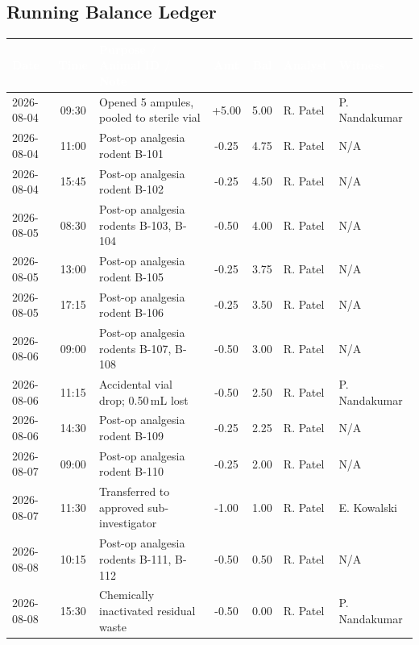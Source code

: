 \subsection*{\color{brandnavy}Running Balance Ledger}
\begin{tabularx}{\linewidth}{@{} l c X c c l l @{}}
\toprule
\rowcolor{brandnavy}
\textcolor{white}{\textbf{Date}} & \textcolor{white}{\textbf{Time}} & \textcolor{white}{\textbf{Purpose / Animal ID / Note}} & \textcolor{white}{\textbf{Amt}} & \textcolor{white}{\textbf{Bal}} & \textcolor{white}{\textbf{Analyst}} & \textcolor{white}{\textbf{Witness}} \\
\midrule
2026-08-04 & 09:30 & Opened 5 ampules, pooled to sterile vial & +5.00 & 5.00 & R. Patel & P. Nandakumar \\
2026-08-04 & 11:00 & Post-op analgesia rodent B-101 & -0.25 & 4.75 & R. Patel & N/A \\
2026-08-04 & 15:45 & Post-op analgesia rodent B-102 & -0.25 & 4.50 & R. Patel & N/A \\
2026-08-05 & 08:30 & Post-op analgesia rodents B-103, B-104 & -0.50 & 4.00 & R. Patel & N/A \\
2026-08-05 & 13:00 & Post-op analgesia rodent B-105 & -0.25 & 3.75 & R. Patel & N/A \\
2026-08-05 & 17:15 & Post-op analgesia rodent B-106 & -0.25 & 3.50 & R. Patel & N/A \\
2026-08-06 & 09:00 & Post-op analgesia rodents B-107, B-108 & -0.50 & 3.00 & R. Patel & N/A \\
2026-08-06 & 11:15 & Accidental vial drop; 0.50\,mL lost & -0.50 & 2.50 & R. Patel & P. Nandakumar \\
2026-08-06 & 14:30 & Post-op analgesia rodent B-109 & -0.25 & 2.25 & R. Patel & N/A \\
2026-08-07 & 09:00 & Post-op analgesia rodent B-110 & -0.25 & 2.00 & R. Patel & N/A \\
2026-08-07 & 11:30 & Transferred to approved sub-investigator & -1.00 & 1.00 & R. Patel & E. Kowalski \\
2026-08-08 & 10:15 & Post-op analgesia rodents B-111, B-112 & -0.50 & 0.50 & R. Patel & N/A \\
2026-08-08 & 15:30 & Chemically inactivated residual waste & -0.50 & 0.00 & R. Patel & P. Nandakumar \\
\bottomrule
\end{tabularx}

\vspace{15pt}

